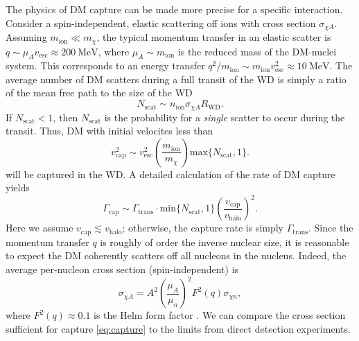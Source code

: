\documentclass[preprintnumbers,amsmath,amssymb,prd,superscriptaddress]{revtex4}
\newcommand{\Eboom}{\mathcal{E}_\text{boom}}
\newcommand{\MeV}{\text{MeV}}
\newcommand{\cm}{\text{cm}}
\def\r{\right)}
\def\l{\left(}
\begin{document}
The physics of DM capture can be made more precise for a specific interaction.
Consider a spin-independent, elastic scattering off ions with cross section $\sigma_{\chi A}$. 
Assuming $m_\text{ion} \ll m_\chi$, the typical momentum transfer in an elastic scatter is $q \sim \mu_{A} v_\text{esc} \approx 200 ~\MeV$, where $\mu_{A} \sim m_\text{ion}$ is the reduced mass of the DM-nuclei system. 
This corresponds to an energy transfer $q^2/m_\text{ion} \sim m_\text{ion} v_\text{esc}^2 \approx 10 ~\MeV$. 
The average number of DM scatters during a full transit of the WD is simply a ratio of the mean free path to the size of the WD
\begin{equation}
N_\text{scat} \sim n_\text{ion} \sigma_{\chi A} R_\text{WD}.
\end{equation}
If $N_\text{scat} < 1$, then $N_\text{scat}$ is the probability for a \emph{single} scatter to occur during the transit. 
Thus, DM with initial velocites less than
\begin{equation}
\label{eq:capture}
v_\text{cap}^2 \sim v_\text{esc}^2 \l \frac{m_\text{ion}}{m_\chi} \r \text{max}\{N_\text{scat} ,1\}.
\end{equation}
will be captured in the WD. 
A detailed calculation of the rate of DM capture \cite{Gould} yields  
\begin{equation}
\Gamma_\text{cap} \sim \Gamma_\text{trans} \cdot \text{min}\{N_\text{scat}, 1\} \l \frac{v_\text{cap}}{v_\text{halo}} \r^2.
\end{equation}
Here we assume $v_\text{cap} \lesssim v_\text{halo}$; otherwise, the capture rate is simply $\Gamma_\text{trans}$. 
Since the momentum transfer $q$ is roughly of order the inverse nuclear size, it is reasonable to expect the DM coherently scatters off all nucleons in the nucleus. 
Indeed, the average per-nucleon cross section (spin-independent) is
\begin{equation}
\sigma_{\chi A} = A^2 \l \frac{\mu_{A}}{\mu_{n}}\r^2 F^2(q) \sigma_{\chi n},
\end{equation}
where $F^2(q) \approx 0.1$ is the Helm form factor \cite{LUX thesis}.  
We can compare the cross section sufficient for capture \eqref{eq:capture} to the limits from direct detection experiments.
\end{document}
